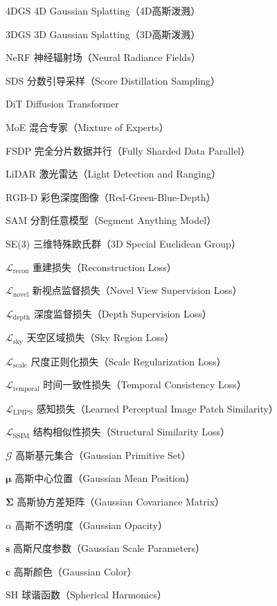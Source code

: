 
\begin{denotation}[4cm]
  \item[4DGS] 4D Gaussian Splatting（4D高斯泼溅）
  \item[3DGS] 3D Gaussian Splatting（3D高斯泼溅）
  \item[NeRF] 神经辐射场（Neural Radiance Fields）
  \item[SDS] 分数引导采样（Score Distillation Sampling）
  \item[DiT] Diffusion Transformer
  \item[MoE] 混合专家（Mixture of Experts）
  \item[FSDP] 完全分片数据并行（Fully Sharded Data Parallel）
  \item[LiDAR] 激光雷达（Light Detection and Ranging）
  \item[RGB-D] 彩色深度图像（Red-Green-Blue-Depth）
  \item[SAM] 分割任意模型（Segment Anything Model）
  \item[SE(3)] 三维特殊欧氏群（3D Special Euclidean Group）
  
  \item[$\mathcal{L}_{\text{recon}}$] 重建损失（Reconstruction Loss）
  \item[$\mathcal{L}_{\text{novel}}$] 新视点监督损失（Novel View Supervision Loss）
  \item[$\mathcal{L}_{\text{depth}}$] 深度监督损失（Depth Supervision Loss）
  \item[$\mathcal{L}_{\text{sky}}$] 天空区域损失（Sky Region Loss）
  \item[$\mathcal{L}_{\text{scale}}$] 尺度正则化损失（Scale Regularization Loss）
  \item[$\mathcal{L}_{\text{temporal}}$] 时间一致性损失（Temporal Consistency Loss）
  \item[$\mathcal{L}_{\text{LPIPS}}$] 感知损失（Learned Perceptual Image Patch Similarity）
  \item[$\mathcal{L}_{\text{SSIM}}$] 结构相似性损失（Structural Similarity Loss）
  
  \item[$\mathcal{G}$] 高斯基元集合（Gaussian Primitive Set）
  \item[$\boldsymbol{\mu}$] 高斯中心位置（Gaussian Mean Position）
  \item[$\boldsymbol{\Sigma}$] 高斯协方差矩阵（Gaussian Covariance Matrix）
  \item[$\alpha$] 高斯不透明度（Gaussian Opacity）
  \item[$\mathbf{s}$] 高斯尺度参数（Gaussian Scale Parameters）
  \item[$\mathbf{c}$] 高斯颜色（Gaussian Color）
  \item[SH] 球谐函数（Spherical Harmonics）
  

\end{denotation}
